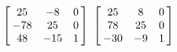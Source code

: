 {$\left[\hskip -3pt \begin{array}{ccc} 25&-8&0\\  -78&25&0
\\  48&-15&1\end{array}\hskip -3pt \right]$ 
}
{$ \left[\hskip -3pt \begin{array}{ccc} 25&8&0\\  78&25&0
\\  -30&-9&1\end{array}\hskip -3pt \right]$}
